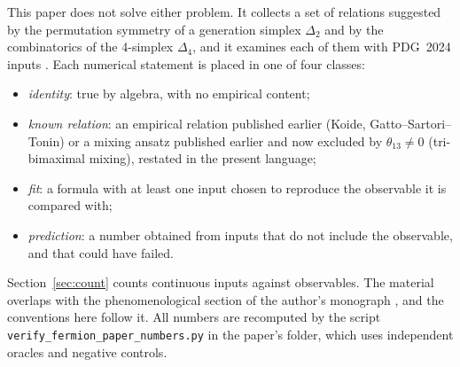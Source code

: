 \documentclass[11pt,reqno]{amsart}
\theoremstyle{definition}
\begin{document}
This paper does not solve either problem. It collects a set of relations suggested by the permutation symmetry of a generation simplex $\Delta_2$ and by the combinatorics of the 4-simplex $\Delta_4$, and it examines each of them with PDG~2024 inputs \cite{pdg2024}. Each numerical statement is placed in one of four classes:
\begin{itemize}
    \item \emph{identity}: true by algebra, with no empirical content;
    \item \emph{known relation}: an empirical relation published earlier (Koide, Gatto--Sartori--Tonin) or a mixing ansatz published earlier and now excluded by $\theta_{13} \neq 0$ (tri-bimaximal mixing), restated in the present language;
    \item \emph{fit}: a formula with at least one input chosen to reproduce the observable it is compared with;
    \item \emph{prediction}: a number obtained from inputs that do not include the observable, and that could have failed.
\end{itemize}
Section~\ref{sec:count} counts continuous inputs against observables. The material overlaps with the phenomenological section of the author's monograph \cite[Ch.~12, Sec.~7]{silvafilho2026book}, and the conventions here follow it. All numbers are recomputed by the script \texttt{verify\_fermion\_paper\_numbers.py} in the paper's folder, which uses independent oracles and negative controls.
\end{document}
